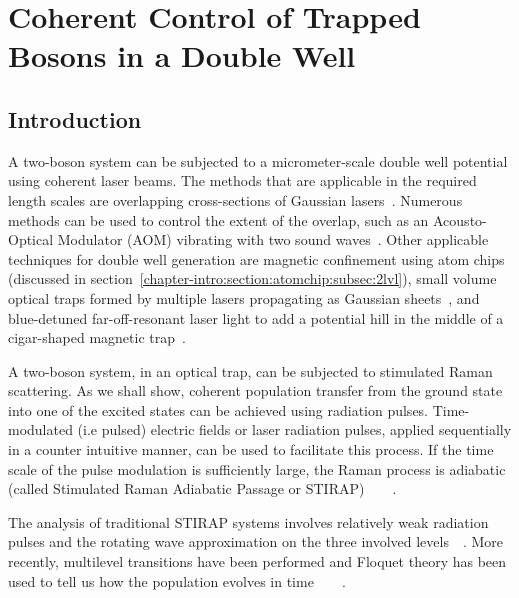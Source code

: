 \chapter{Coherent Control of Trapped Bosons in a Double Well}
%
\label{chapter-dblwell}
\section{\label{sec:1} Introduction}
%
%
A two-boson system can be subjected to a micrometer-scale double well potential using coherent laser beams. The methods that are applicable in the required length scales are overlapping cross-sections of Gaussian lasers~\cite{dudarev:entanglement}. Numerous methods can be used to control the extent of the overlap, such as an Acousto-Optical Modulator (AOM) vibrating with two sound waves~\cite{ketterle:aom}. Other applicable techniques for double well generation are magnetic confinement using atom chips (discussed in section~\ref{chapter-intro:section:atomchip:subsec:2lvl}), small volume optical traps formed by multiple lasers propagating as Gaussian sheets~\cite{raizen}, and blue-detuned far-off-resonant laser light to add a potential hill in the middle of a cigar-shaped magnetic trap~\cite{andrews:science}.

A two-boson system, in an optical trap, can be subjected to stimulated Raman scattering. As we shall show, coherent population transfer from the ground state into one of the excited states can be achieved using radiation pulses.  Time-modulated (i.e pulsed) electric fields or laser radiation pulses, applied sequentially in a counter intuitive manner,  can be used to facilitate this process. If the time scale of the pulse modulation is sufficiently large, the Raman process is adiabatic  (called Stimulated Raman Adiabatic Passage or STIRAP)~\cite{stirap:hioe}~\cite{hioe:rwa:stirap}~\cite{stirap:theory}~\cite{stirap:review}. 

The analysis of traditional STIRAP systems involves  relatively weak radiation pulses and the rotating wave approximation on the three involved levels~\cite{stirap:theory}~\cite{stirap:review}. More recently, multilevel transitions  have been performed and  Floquet theory has been used  to tell us how the population evolves in time~\cite{na-reichl:pbox}~\cite{na-reichl:mol-rot}~\cite{holder-reichl:avoidedcross}~\cite{na-reichl:isomer}. 

